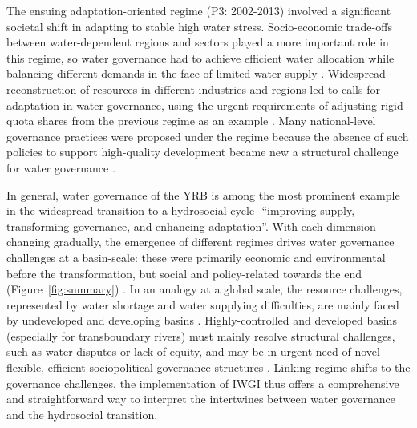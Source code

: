 The ensuing adaptation-oriented regime (P3: 2002-2013) involved a significant societal shift in adapting to stable high water stress.
Socio-economic trade-offs between water-dependent regions and sectors played a more important role in this regime, so water governance had to achieve efficient water allocation while balancing different demands in the face of limited water supply
\cite{dalin2015,song2022}.
Widespread reconstruction of resources in different industries and regions led to calls for adaptation in water governance, using the urgent requirements of adjusting rigid quota shares from the previous regime as an example \cite{wang2019a}.
Many national-level governance practices were proposed under the regime because the absence of such policies to support high-quality development became new a structural challenge for water governance
\cite{konar2019}.

In general, water governance of the YRB is among the most prominent example in the widespread transition to a hydrosocial cycle -``improving supply, transforming governance, and enhancing adaptation''.
With each dimension changing gradually, the emergence of different regimes drives water governance challenges at a basin-scale: these were primarily economic and environmental before the transformation, but social and policy-related towards the end (Figure~\ref{fig:summary}) \cite{singh2019,porcher2019}.
In an analogy at a global scale, the resource challenges, represented by water shortage and water supplying difficulties, are mainly faced by undeveloped and developing basins
\cite{allan2019,speed2013,liu2012a}.
Highly-controlled and developed basins (especially for transboundary rivers) must mainly resolve structural challenges, such as water disputes or lack of equity, and may be in urgent need of novel flexible, efficient sociopolitical governance structures
\cite{unep-dhi2016,mirumachi2015}.
Linking regime shifts to the governance challenges, the implementation of IWGI thus offers a comprehensive and straightforward way to interpret the intertwines between water governance and the hydrosocial transition.

